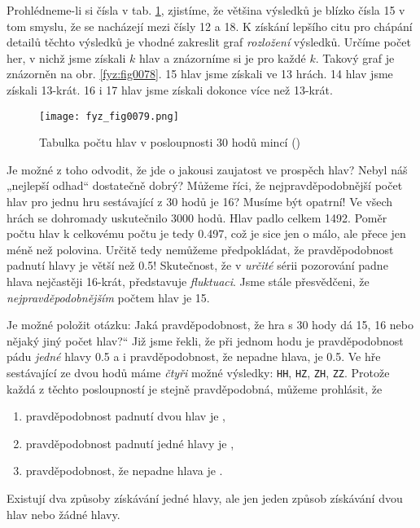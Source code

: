     Prohlédneme-li si čísla v tab. \ref{fyz:fig0079}, zjistíme, že většina výsledků je blízko čísla 
    \num{15} v tom smyslu, že se nacházejí mezi čísly \num{12} a \num{18}. K získání lepšího citu 
    pro chápání detailů těchto výsledků je vhodné zakreslit graf \emph{rozložení} výsledků. Určíme 
    počet her, v nichž jsme získali \(k\) hlav a znázorníme si je pro každé \(k\). Takový graf je 
    znázorněn na obr. \ref{fyz:fig0078}. \num{15} hlav jsme získali ve \num{13} hrách. \num{14} 
    hlav jsme získali \num{13}-krát. \num{16} i \num{17} hlav jsme získali dokonce více než 
    \num{13}-krát.

    \begin{figure}[ht!]  %
      \centering
      \texttt{[image: fyz\_fig0079.png]}
      \caption{Tabulka počtu hlav v posloupnosti \num{30} hodů mincí (\cite[s.~80]{Feynman01})}
      \label{fyz:fig0079}
    \end{figure}
    Je možné z toho odvodit, že jde o jakousi zaujatost ve prospěch hlav? Nebyl náš „nejlepší 
    odhad“ dostatečně dobrý? Můžeme říci, že nejpravděpodobnější počet hlav pro jednu hru 
    sestávající z \num{30} hodů je \num{16}? Musíme být opatrní! Ve všech hrách se dohromady 
    uskutečnilo \num{3000} hodů. Hlav padlo celkem \num{1492}. Poměr počtu hlav k celkovému počtu 
    je tedy \num{0.497}, což je sice jen o málo, ale přece jen méně než polovina. Určitě tedy 
    nemůžeme předpokládat, že pravděpodobnost padnutí hlavy je větší než \num{0.5}! Skutečnost, že 
    v \emph{určité} sérii pozorování padne hlava nejčastěji \num{16}-krát, představuje 
    \emph{fluktuaci}. Jsme stále přesvědčeni, že \emph{nejpravděpodobnějším} počtem hlav je 
    \num{15}.
    
    Je možné položit otázku: Jaká pravděpodobnost, že hra s \num{30} hody dá \num{15}, \num{16} 
    nebo nějaký jiný počet hlav?“ Již jsme řekli, že při jednom hodu je pravděpodobnost pádu 
    \emph{jedné} hlavy \num{0.5} a i pravděpodobnost, že nepadne hlava, je \num{0.5}. Ve hře 
    sestávající ze dvou hodů máme \emph{čtyři} možné výsledky: \texttt{HH}, \texttt{HZ}, 
    \texttt{ZH}, \texttt{ZZ}. Protože každá z těchto posloupností je stejně pravděpodobná, můžeme 
    prohlásit, že
    \begin{enumerate}[noitemsep]
      \item pravděpodobnost padnutí dvou hlav je , 
      \item pravděpodobnost padnutí jedné hlavy je , 
      \item pravděpodobnost, že nepadne hlava je . 
    \end{enumerate}
    Existují dva způsoby získávání jedné hlavy, ale jen jeden způsob získávání dvou hlav nebo žádné 
    hlavy.
    
